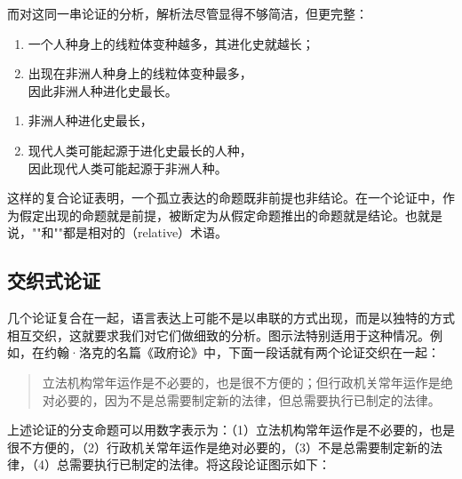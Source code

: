 而对这同一串论证的分析，解析法尽管显得不够简洁，但更完整：

\begin{enumerate}
  \item 一个人种身上的线粒体变种越多，其进化史就越长；
  \item 出现在非洲人种身上的线粒体变种最多，\\
  因此非洲人种进化史最长。
\end{enumerate}

\begin{enumerate}
  \item 非洲人种进化史最长，
  \item 现代人类可能起源于进化史最长的人种，\\
  因此现代人类可能起源于非洲人种。
\end{enumerate}

这样的复合论证表明，一个孤立表达的命题既非前提也非结论。在一个论证中，作为假定出现的命题就是前提，被断定为从假定命题推出的命题就是结论。也就是说，""和""都是相对的（relative）术语。

\subsection{交织式论证}

几个论证复合在一起，语言表达上可能不是以串联的方式出现，而是以独特的方式相互交织，这就要求我们对它们做细致的分析。图示法特别适用于这种情况。例如，在约翰·洛克的名篇《政府论》中，下面一段话就有两个论证交织在一起：

\begin{quotation}
立法机构常年运作是不必要的，也是很不方便的；但行政机关常年运作是绝对必要的，因为不是总需要制定新的法律，但总需要执行已制定的法律。
\end{quotation}

上述论证的分支命题可以用数字表示为：（1）立法机构常年运作是不必要的，也是很不方便的，（2）行政机关常年运作是绝对必要的，（3）不是总需要制定新的法律，（4）总需要执行已制定的法律。将这段论证图示如下：

